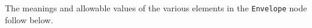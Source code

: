 
The meanings and allowable values of the various elements in the \lstinline!Envelope!  node follow below.

